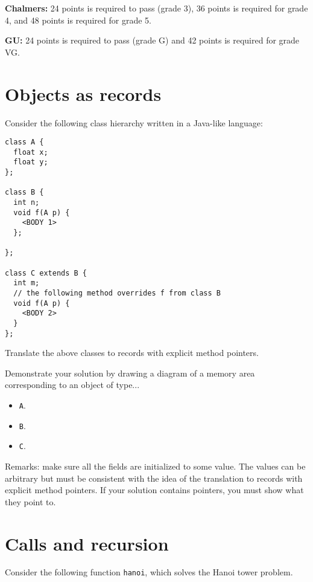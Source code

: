 \documentclass{article}
\newcommand{\answer}[1]{}
\begin{document}
\textbf{Chalmers:}
24 points is required to pass (grade 3), 36 points is required for
grade 4, and 48 points is required for grade 5.

\textbf{GU:}
24 points is required to pass (grade G) and 42 points is
required for grade VG.

\section{Objects as records}

Consider the following class hierarchy written in a Java-like
language:
\begin{verbatim}
class A {
  float x;
  float y;
};

class B {
  int n;
  void f(A p) {
    <BODY 1>
  };

};

class C extends B {
  int m;
  // the following method overrides f from class B
  void f(A p) { 
    <BODY 2>
  }
};
\end{verbatim}

Translate the above classes to records with explicit method pointers.

Demonstrate your solution by drawing a diagram of a memory area
corresponding to an object of type...
\begin{itemize}
\item \texttt A. 
\item \texttt B. 
\item \texttt C. 
\end{itemize}
Remarks: make sure all the fields are initialized to some value. The
values can be arbitrary but must be consistent with the idea of the
translation to records with explicit method pointers. If your solution
contains pointers, you must show what they point to.

\answer{
\begin{verbatim}
    struct A {
      float x = 0
      float y = 0
    }
    struct B {
      int n = 0
      void* f(B* this, A* p) = <BODY1>;
    }
    struct C {
      int n = 0
      void* f(C* this, A* p) = <BODY2>;
      int m;
    }
\end{verbatim}
}

\newpage
\section{Calls and recursion}

Consider the following function \texttt{hanoi},
which solves the Hanoi tower problem.
\end{document}
